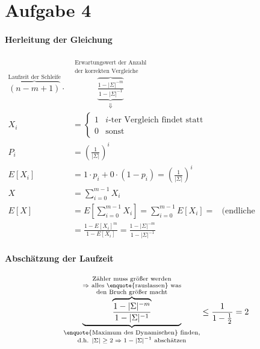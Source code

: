 \section*{Aufgabe 4}
\paragraph{Herleitung der Gleichung}
\begin{align*}
	\overbrace{(n - m + 1)}^\text{Laufzeit der Schleife} \cdot &\overbrace{\underbrace{\frac{1 - |\Sigma|^{-m}}{1 - |\Sigma|^{-1}}}_\Downarrow}^{\substack{\text{Erwartungswert der Anzahl} \\ \text{der korrekten Vergleiche}}} \\[1cm]
	X_i &= \left\{ \begin{matrix}
    					1 & \text{$i$-ter Vergleich findet statt} \\
                        0 & \text{sonst}
    			   \end{matrix} \right. \\
	P_i &= \left( \frac{1}{|\Sigma|} \right)^i \\
    E[X_i] &= 1 \cdot p_i + 0 \cdot ( 1 - p_i) = \left( \frac{1}{|\Sigma|} \right)^i \\[0.5cm]
    X &= \sum_{i = 0}^{m - 1} X_i \\
    E[X] &= E\left[\sum_{i = 0}^{m - 1} X_i \right] = \sum_{i = 0}^{m - 1} E[X_i] = &\text{(endliche geometrische Reihe)}\\
    &= \frac{1 - E[X_i]^m}{1 - E[X_i]} = \frac{1 - |\Sigma|^{-m}}{1 - |\Sigma|^{-1}}
\end{align*}

\paragraph{Abschätzung der Laufzeit}
\begin{align*}
	\underbrace{\overbrace{\frac{1 - |\Sigma|^{-m}}{1 - |\Sigma|^{-1}}}^{\substack{\text{Zähler muss größer werden} \\ \text{$\Rightarrow$ alles \enquote{rauslassen} was} \\ \text{den Bruch größer macht}}}}_{\substack{\text{\enquote{Maximum des Dynamischen} finden,} \\ \text{d.h. $|\Sigma| \geq 2 \Rightarrow 1 - |\Sigma|^{-1}$ abschätzen}}} \leq \frac{1}{1 - \frac{1}{2}} = 2
\end{align*}